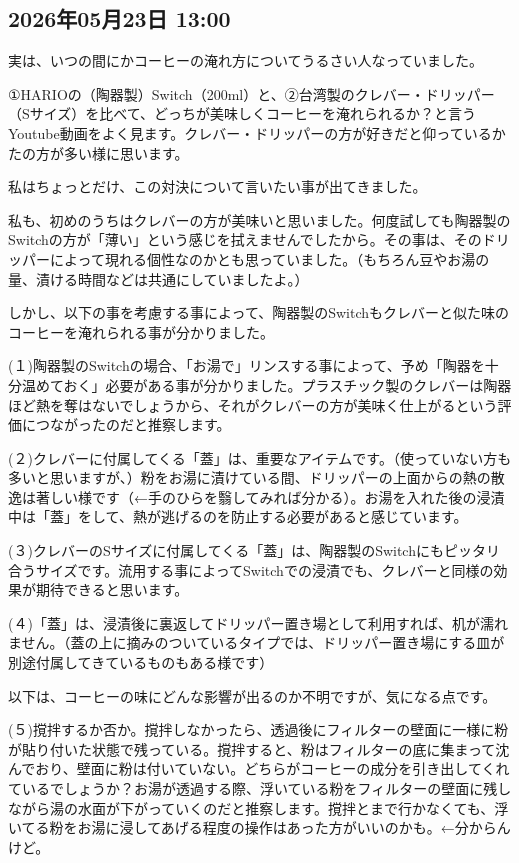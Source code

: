 \subsection*{2026年05月23日 13:00}

実は、いつの間にかコーヒーの淹れ方についてうるさい人なっていました。

①HARIOの（陶器製）Switch（200ml）と、②台湾製のクレバー・ドリッパー（Sサイズ）を比べて、どっちが美味しくコーヒーを淹れられるか？と言うYoutube動画をよく見ます。クレバー・ドリッパーの方が好きだと仰っているかたの方が多い様に思います。

私はちょっとだけ、この対決について言いたい事が出てきました。

私も、初めのうちはクレバーの方が美味いと思いました。何度試しても陶器製のSwitchの方が「薄い」という感じを拭えませんでしたから。その事は、そのドリッパーによって現れる個性なのかとも思っていました。（もちろん豆やお湯の量、漬ける時間などは共通にしていましたよ。）

しかし、以下の事を考慮する事によって、陶器製のSwitchもクレバーと似た味のコーヒーを淹れられる事が分かりました。

(１)陶器製のSwitchの場合、「お湯で」リンスする事によって、予め「陶器を十分温めておく」必要がある事が分かりました。プラスチック製のクレバーは陶器ほど熱を奪はないでしょうから、それがクレバーの方が美味く仕上がるという評価につながったのだと推察します。

(２)クレバーに付属してくる「蓋」は、重要なアイテムです。（使っていない方も多いと思いますが、）粉をお湯に漬けている間、ドリッパーの上面からの熱の散逸は著しい様です（←手のひらを翳してみれば分かる）。お湯を入れた後の浸漬中は「蓋」をして、熱が逃げるのを防止する必要があると感じています。

(３)クレバーのSサイズに付属してくる「蓋」は、陶器製のSwitchにもピッタリ合うサイズです。流用する事によってSwitchでの浸漬でも、クレバーと同様の効果が期待できると思います。

(４)「蓋」は、浸漬後に裏返してドリッパー置き場として利用すれば、机が濡れません。（蓋の上に摘みのついているタイプでは、ドリッパー置き場にする皿が別途付属してきているものもある様です）

以下は、コーヒーの味にどんな影響が出るのか不明ですが、気になる点です。

(５)撹拌するか否か。撹拌しなかったら、透過後にフィルターの壁面に一様に粉が貼り付いた状態で残っている。撹拌すると、粉はフィルターの底に集まって沈んでおり、壁面に粉は付いていない。どちらがコーヒーの成分を引き出してくれているでしょうか？お湯が透過する際、浮いている粉をフィルターの壁面に残しながら湯の水面が下がっていくのだと推察します。撹拌とまで行かなくても、浮いてる粉をお湯に浸してあげる程度の操作はあった方がいいのかも。←分からんけど。

